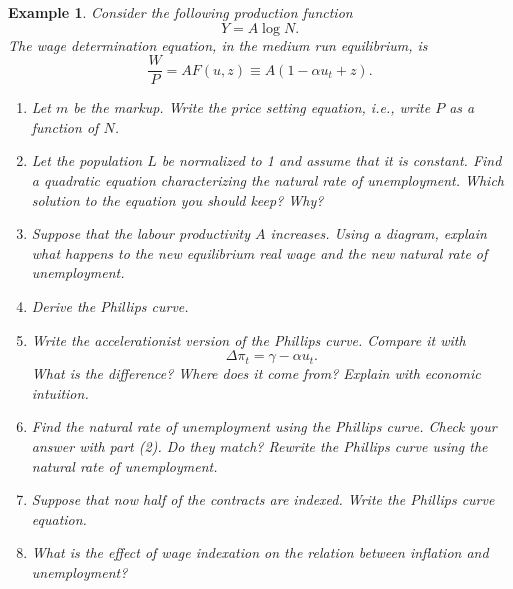 \documentclass[12pt]{article}
\newtheorem{example}{Example}
\begin{document}
\begin{example}
    Consider the following production function
    \[Y = A \log N.\]
    The wage determination equation, in the medium run equilibrium, is
    \[\frac{W}{P} = AF(u,z)\equiv A(1-\alpha u_t + z).\]
    \begin{enumerate}[label=(\arabic*)]
        \item Let $m$ be the markup. Write the price setting equation, \textit{i.e.,} write $P$ as a function of $N$.
        \vspace{24pt}
        \item Let the population $L$ be normalized to 1 and assume that it is constant. Find a quadratic equation characterizing the natural rate of unemployment. Which solution to the equation you should keep? Why?
        \vspace{24pt}
        \item Suppose that the labour productivity $A$ increases. Using a diagram, explain what happens to the new equilibrium real wage and the new natural rate of unemployment.
        \vspace{48pt}
        \item Derive the Phillips curve.
        \vspace{24pt}
        \item Write the accelerationist version of the Phillips curve. Compare it with
        \[\Delta \pi_t = \gamma - \alpha u_t.\]
        What is the difference? Where does it come from? Explain with economic intuition.
        \vspace{24pt}
        \item Find the natural rate of unemployment using the Phillips curve. Check your answer with part (2). Do they match? Rewrite the Phillips curve using the natural rate of unemployment.
        \vspace{48pt}
        \item Suppose that now half of the contracts are indexed. Write the Phillips curve equation.
        \vspace{48pt}
        \item What is the effect of wage indexation on the relation between inflation and unemployment?
        \vspace{24pt}
    \end{enumerate}
\end{example}
\end{document}
